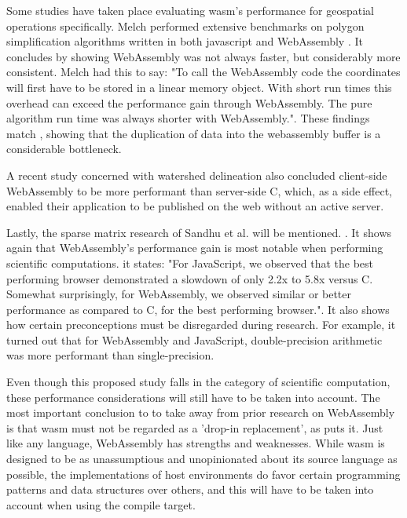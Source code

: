 Some studies have taken place evaluating \ac{wasm}'s performance for geospatial operations specifically. 
Melch performed extensive benchmarks on polygon simplification algorithms written in both javascript and WebAssembly \cite{melch_performance_2019}. 
It concludes by showing WebAssembly was not always faster, but considerably more consistent. 
Melch had this to say: "To call the WebAssembly code the coordinates will first have to be stored in a linear memory object. 
With short run times this overhead can exceed the performance gain through WebAssembly. 
The pure algorithm run time was always shorter with WebAssembly.". 
These findings match \cite{jangda_not_2019}, showing that the duplication of data into the webassembly buffer is a considerable bottleneck.

A recent study concerned with watershed delineation \cite{sit_optimized_2019} also concluded client-side WebAssembly to be more performant than server-side C, which, as a side effect, enabled their application to be published on the web without an active server. 

Lastly, the sparse matrix research of Sandhu et al. will be mentioned. \cite{sandhu_sparse_2018}. It shows again that WebAssembly's performance gain is most notable when performing scientific computations. it states: "For JavaScript, we observed that the best performing browser demonstrated a slowdown of only 2.2x to 5.8x versus C. Somewhat surprisingly, for WebAssembly, we observed similar or better performance as compared to C, for the best performing browser.". It also shows how certain preconceptions must be disregarded during research. For example, it turned out that for WebAssembly and JavaScript, double-precision arithmetic was more performant than single-precision.

Even though this proposed study falls in the category of scientific computation, these performance considerations will still have to be taken into account. The most important conclusion to to take away from prior research on WebAssembly is that \ac{wasm} must not be regarded as a 'drop-in replacement', as \cite{melch_performance_2019} puts it. Just like any language, WebAssembly has strengths and weaknesses. While \ac{wasm} is designed to be as unassumptious and unopinionated about its source language as possible, the implementations of host environments do favor certain programming patterns and data structures over others, and this will have to be taken into account when using the compile target.

